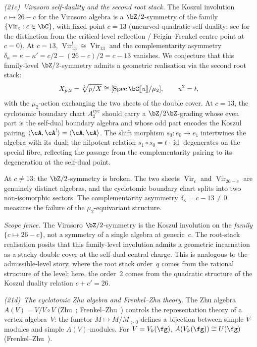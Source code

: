 \emph{(21c)~Virasoro self-duality and the second root stack.}%
\label{item:concordance-cyclotomic-virasoro}%
%
%
\ClaimStatusConjectured{}
The Koszul involution
$c \mapsto 26 - c$ for the Virasoro algebra
is a $\bZ/2$-symmetry of the family
$\{\operatorname{Vir}_c : c \in \bC\}$,
with fixed point $c = 13$
(uncurved-quadratic self-duality;
see for the distinction from the
critical-level reflection / Feigin--Frenkel centre point at $c = 0$).
At $c = 13$,
$\operatorname{Vir}_{13}^! \cong \operatorname{Vir}_{13}$
and the complementarity asymmetry
$\delta_\kappa = \kappa - \kappa' = c/2 - (26-c)/2 = c - 13$
vanishes. We conjecture that this
family-level $\bZ/2$-symmetry admits a geometric
realisation via the second root stack:
\[
X_{p,2} = \sqrt[2]{p/X}
\cong [\operatorname{Spec}\bC[\![u]\!] / \mu_2],
\qquad u^2 = t,
\]
with the $\mu_2$-action exchanging the two sheets
of the double cover. At $c = 13$, the cyclotomic
boundary chart $A^{\mathrm{cyc}}_{2}$ should carry
a $\bZ/2\bZ$-grading whose even part is the
self-dual boundary algebra and whose odd part
encodes the Koszul pairing
$\langle \cA, \cA^! \rangle = \langle \cA, \cA \rangle$.
The shift morphism $s_0 \colon e_0 \to e_1$
intertwines the algebra with its dual; the nilpotent
relation $s_1 \circ s_0 = t \cdot \operatorname{id}$
degenerates on the special fibre, reflecting the
passage from the complementarity pairing to
its degeneration at the self-dual point.

At $c \neq 13$: the $\bZ/2$-symmetry is broken.
The two sheets $\operatorname{Vir}_c$ and
$\operatorname{Vir}_{26-c}$ are genuinely distinct
algebras, and the cyclotomic boundary chart
splits into two non-isomorphic sectors.
The complementarity asymmetry
$\delta_\kappa = c - 13 \neq 0$
measures the failure of the $\mu_2$-equivariant
structure.

\emph{Scope fence.}
The Virasoro $\bZ/2$-symmetry is the Koszul
involution on the \emph{family}
$\{c \mapsto 26 - c\}$, not a symmetry of
a single algebra at generic~$c$.
The root-stack realisation posits that this
family-level involution admits a geometric
incarnation as a stacky double cover at the
self-dual central charge.
This is analogous to the admissible-level story,
where the root stack order~$q$ comes from the
rational structure of the level; here, the
order~$2$ comes from the quadratic structure
of the Koszul duality relation $c + c' = 26$.

\emph{(21d)~The cyclotomic Zhu algebra and
Frenkel--Zhu theory.}%
\label{item:concordance-cyclotomic-zhu}%
%
%
\ClaimStatusConjectured{}
The Zhu algebra $A(V) = V / V \circ V$
(Zhu~\cite{Zhu96}; Frenkel--Zhu~\cite{FZ92})
controls the representation theory of a vertex
algebra~$V$: the functor $M \mapsto M/M_{>0}$
defines a bijection between simple
$V$\nobreakdash-modules and simple
$A(V)$\nobreakdash-modules.
For $V = V_k(\fg)$,
$A(V_k(\fg)) \cong U(\fg)$
(Frenkel--Zhu~\cite{FZ92}).


